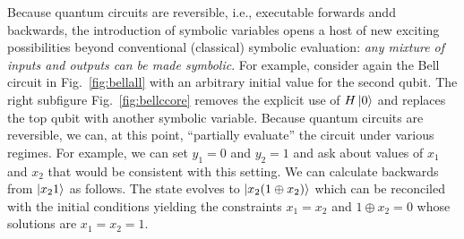 \documentclass[sigplan,review]{acmart}
\begin{document}
Because quantum circuits are reversible, i.e., executable forwards
andd backwards, the introduction of symbolic variables opens a host of
new exciting possibilities beyond conventional (classical) symbolic
evaluation: \emph{any mixture of inputs and outputs can be made
  symbolic}. For example, consider again the Bell circuit in
Fig.~\ref{fig:bellall} with an arbitrary initial value for the second
qubit. The right subfigure Fig.~\ref{fig:bellccore} removes the
explicit use of $H\ket{0}$ and replaces the top qubit with another
symbolic variable. Because quantum circuits are reversible, we can, at
this point, ``partially evaluate'' the circuit under various
regimes. For example, we can set $y_1=0$ and $y_2=1$ and ask about
values of $x_1$ and $x_2$ that would be consistent with this
setting. We can calculate backwards from $\ket{x_21}$ as follows. The
state evolves to $\ket{x_2(1 \oplus x_2)}$ which can be reconciled
with the initial conditions yielding the constraints $x_1=x_2$ and
$1 \oplus x_2 = 0$ whose solutions are $x_1 = x_2 = 1$.
\end{document}
